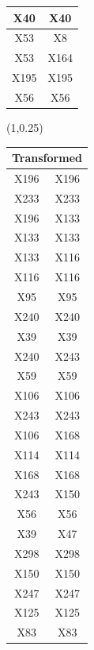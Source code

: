 \documentclass{beamer}
\newcommand{\boz}{\cellcolor{pathwaynode}}
\begin{document}
\begin{frame}
\begin{textblock*}{\paperwidth}
\begin{tabular}{| c c |}
X40   &  X40  \\ \hline
X53   &  X8  \\ \hline
X53   &  X164  \\ \hline
X195   &  X195  \\ \hline
X56   &  X56  \\ \hline
    \end{tabular}
    \hspace{.5em}
  \end{textblock*}
  \begin{textblock*}{\paperwidth}(1\textwidth,0.25\textheight)
    \raggedright 
    \tiny
    \begin{tabular}{| c c |}
      \hline
\toprule
\multicolumn{2}{c}{Transformed} \\ 
\midrule \hline
\boz X196   &  \boz X196  \\ \hline
X233   &  X233  \\ \hline
\boz X196   &  \boz X133  \\ \hline
\boz X133   &  \boz X133  \\ \hline
\boz X133   &  \boz X116  \\ \hline
\boz X116   &  \boz X116  \\ \hline
X95   &  X95  \\ \hline
\boz X240   &  \boz X240  \\ \hline
X39   &  X39  \\ \hline
\boz X240   &  \boz X243  \\ \hline
X59   &  X59  \\ \hline
X106   &  X106  \\ \hline
\boz X243   &  \boz X243  \\ \hline
X106   &  X168  \\ \hline
X114   &  X114  \\ \hline
X168   &  X168  \\ \hline
\boz X243   &  \boz X150  \\ \hline
X56   &  X56  \\ \hline
X39   &  X47  \\ \hline
X298   &  X298  \\ \hline
\boz X150   &  \boz X150  \\ \hline
X247   &  X247  \\ \hline
\boz X125   &  \boz X125  \\ \hline
X83   &  X83  \\ \hline
    \end{tabular}
    \hspace{.5em}

\end{textblock*}
\end{frame}
\end{document}
